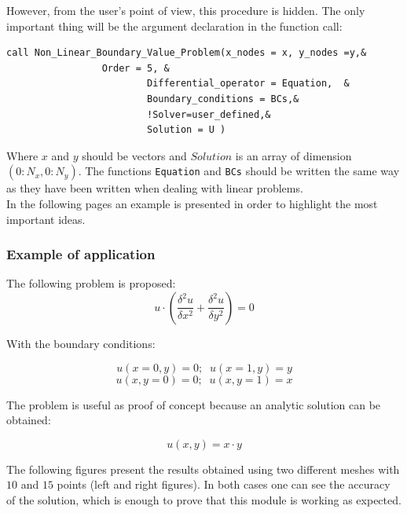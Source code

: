 However, from the user's point of view, this procedure is hidden. The only
important thing will be the argument declaration in the function call: 

\begin{blueframed}
\begin{lstlisting}
call Non_Linear_Boundary_Value_Problem(x_nodes = x, y_nodes =y,&
		         Order = 5, &
                         Differential_operator = Equation,  &
                         Boundary_conditions = BCs,&
                         !Solver=user_defined,&
                         Solution = U )
\end{lstlisting}
\end{blueframed}

Where $x$ and $y$ should be vectors and $Solution$ is an array
of dimension $(0:N_x,0:N_y)$. The functions \texttt{Equation} and
\texttt{BCs} should be written the same way as they have been written when
dealing with linear problems.\\

In the following pages an example is presented in order to highlight the most
important ideas. \\


\newpage

\subsubsection* {Example of application}

The following problem is proposed: \\

$$ u\cdot \left(\frac{\delta^2 u}{\delta x^2}+\frac{\delta^2 u}{\delta
y^2}\right)=0$$

With the boundary conditions: 

$$ u(x=0,y)=0; \;\; u(x=1,y)=y $$
$$ u(x,y=0)=0; \;\; u(x,y=1)=x $$

The problem is useful as proof of concept because an analytic solution can be
obtained:

$$u(x,y)=x\cdot y$$

The following figures present the results obtained using two different meshes
with $10$ and $15$ points (left and right figures). In both cases one can see
the accuracy of the solution, which is enough to prove that this module is working as expected. 

